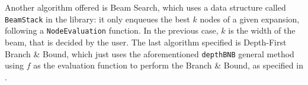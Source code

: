Another algorithm offered is Beam Search, which uses a data structure called
\texttt{BeamStack} in the library: it only enqueues the best $k$ nodes of a
given expansion, following a \texttt{NodeEvaluation} function. In the previous
case, $k$ is the width of the beam, that is decided by the user. The last
algorithm specified is Depth-First Branch \& Bound, which just uses the
aforementioned \texttt{depthBNB} general method using $f$ as the evaluation
function to perform the Branch \& Bound, as specified in
\cite{zhang-1995-bnb}.\\

\newpage

